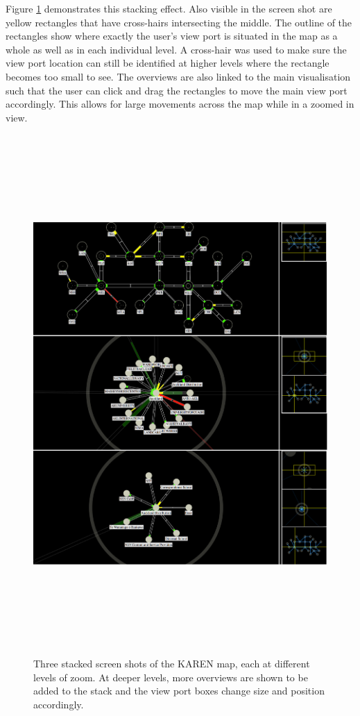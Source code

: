 \documentclass[11pt, a4paper]{report}
\begin{document}
Figure \ref{fig:overviews1.0} demonstrates this stacking effect. Also visible in
the screen shot are yellow rectangles that have cross-hairs intersecting the
middle. The outline of the rectangles show where exactly the user's view port is
situated in the map as a whole as well as in each individual level. A cross-hair
was used to make sure the view port location can still be identified at higher
levels where the rectangle becomes too small to see. The overviews are also
linked to the main visualisation such that the user can click and drag the
rectangles to move the main view port accordingly. This allows for large
movements across the map while in a zoomed in view.

\begin{figure}
\centering
\includegraphics[width=170mm,height=197.95mm]{assets/overviews1-0.eps}
\caption{Three stacked screen shots of the KAREN map, each at different levels
of zoom. At deeper levels, more overviews are shown to be added to the stack
and the view port boxes change size and position accordingly.}
\label{fig:overviews1.0}
\end{figure}
\end{document}
